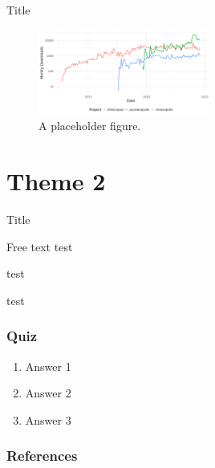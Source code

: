 \documentclass[11pt]{beamer}
\begin{document}
\begin{frame}{Title}

  \citep{vatter2015generalized}

  \begin{figure}[h]
    \centering
    \includegraphics[width=0.5\textwidth]{figures/popularity_vine_software.png}
    \caption{A placeholder figure.}
    \label{fig:placeholder}
  \end{figure}

\end{frame}


\section{Theme 2}

\begin{frame}{Title}



	\begin{block}{Free text}
		test
	\end{block}

  \begin{example}[asdf]
		test
	\end{example}

	\begin{theorem}[asdf]
		test
	\end{theorem}

\end{frame}


\begin{frame}
	\frametitle{Quiz}

	\begin{enumerate}
		\item Answer 1
		\item Answer 2
		\item Answer 3 \onslide<2->{\cmark}
	\end{enumerate}

\end{frame}

\begin{frame}[allowframebreaks]
  \frametitle{References}
  
  
\end{frame}
\end{document}

